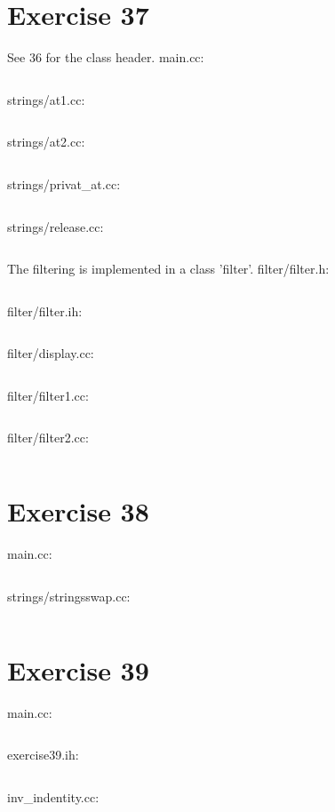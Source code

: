 \documentclass{article}[9pt]
\begin{document}
\section*{Exercise 37}
See 36 for the class header.
main.cc:
\inputminted[linenos=true, tabsize=4, frame=lines]{text}{../363738/main_37.cc}
strings/at1.cc:
\inputminted[linenos=true, tabsize=4, frame=lines]{text}{../363738/strings/at1.cc}
strings/at2.cc:
\inputminted[linenos=true, tabsize=4, frame=lines]{text}{../363738/strings/at2.cc}
strings/privat\_at.cc:
\inputminted[linenos=true, tabsize=4, frame=lines]{text}{../363738/strings/priv_at.cc}
strings/release.cc:
\inputminted[linenos=true, tabsize=4, frame=lines]{text}{../363738/strings/release.cc}
The filtering is implemented in a class 'filter'.
filter/filter.h:
\inputminted[linenos=true, tabsize=4, frame=lines]{text}{../363738/filter/filter.h}
filter/filter.ih:
\inputminted[linenos=true, tabsize=4, frame=lines]{text}{../363738/filter/filter.ih}
filter/display.cc:
\inputminted[linenos=true, tabsize=4, frame=lines]{text}{../363738/filter/display.cc}
filter/filter1.cc:
\inputminted[linenos=true, tabsize=4, frame=lines]{text}{../363738/filter/filter1.cc}
filter/filter2.cc:
\inputminted[linenos=true, tabsize=4, frame=lines]{text}{../363738/filter/filter2.cc}
\section*{Exercise 38}
main.cc:
\inputminted[linenos=true, tabsize=4, frame=lines]{text}{../363738/main_38.cc}
strings/stringsswap.cc:
\inputminted[linenos=true, tabsize=4, frame=lines]{text}{../363738/strings/stringsSwap.cc}
\section*{Exercise 39}
main.cc:
\inputminted[linenos=true, tabsize=4, frame=lines]{text}{../39/main.cc}
exercise39.ih:
\inputminted[linenos=true, tabsize=4, frame=lines]{text}{../39/exercise_39.ih}
inv\_indentity.cc:
\inputminted[linenos=true, tabsize=4, frame=lines]{text}{../39/inv_identity.cc}
\end{document}
